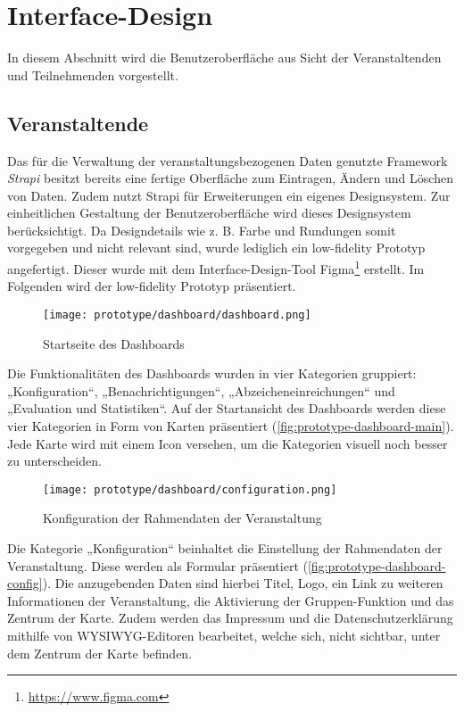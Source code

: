 \section{Interface-Design} \label{sec:interface-design}

In diesem Abschnitt wird die Benutzeroberfläche aus Sicht der Veranstaltenden
und Teilnehmenden vorgestellt.

\subsection{Veranstaltende} \label{ssec:interface-v}

Das für die Verwaltung der veranstaltungsbezogenen Daten genutzte Framework
\textit{Strapi} besitzt bereits eine fertige Oberfläche zum Eintragen, Ändern
und Löschen von Daten. Zudem nutzt Strapi für Erweiterungen ein eigenes
Designsystem. Zur einheitlichen Gestaltung der Benutzeroberfläche wird dieses
Designsystem berücksichtigt. Da Designdetails wie z. B. Farbe und Rundungen
somit vorgegeben und nicht relevant sind, wurde lediglich ein low-fidelity
Prototyp angefertigt. Dieser wurde mit dem Interface-Design-Tool
Figma\footnote{\url{https://www.figma.com}} erstellt. Im Folgenden wird der
low-fidelity Prototyp präsentiert.

\begin{figure}[htpb]
    \centering
    \texttt{[image: prototype/dashboard/dashboard.png]}
    \caption{Startseite des Dashboards}
    \label{fig:prototype-dashboard-main}
\end{figure}

Die Funktionalitäten des Dashboards wurden in vier Kategorien gruppiert:
„Konfiguration“, „Benachrichtigungen“, „Abzeicheneinreichungen“ und „Evaluation
und Statistiken“. Auf der Startansicht des Dashboards werden diese vier
Kategorien in Form von Karten präsentiert (\autoref{fig:prototype-dashboard-main}). Jede Karte wird mit einem Icon
versehen, um die Kategorien visuell noch besser zu unterscheiden.

\begin{figure}[htpb]
    \centering
    \texttt{[image: prototype/dashboard/configuration.png]}
    \caption{Konfiguration der Rahmendaten der Veranstaltung}
    \label{fig:prototype-dashboard-config}
\end{figure}

Die Kategorie „Konfiguration“ beinhaltet die Einstellung der Rahmendaten der
Veranstaltung. Diese werden als Formular präsentiert (\autoref{fig:prototype-dashboard-config}). Die anzugebenden Daten sind hierbei
Titel, Logo, ein Link zu weiteren Informationen der Veranstaltung, die
Aktivierung der Gruppen-Funktion und das Zentrum der Karte. Zudem werden das
Impressum und die Datenschutzerklärung mithilfe von WYSIWYG-Editoren bearbeitet,
welche sich, nicht sichtbar, unter dem Zentrum der Karte befinden.


